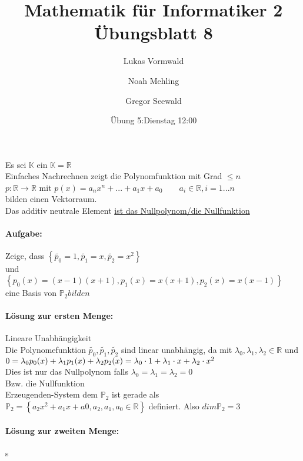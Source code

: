 \documentclass[11pt,a4paper]{article}
\title{Mathematik für Informatiker 2\\Übungsblatt 8}
\author{Lukas Vormwald \and Noah Mehling \and Gregor Seewald}
\date{Übung 5:Dienstag 12:00}
\newcommand{\meth}[1]{\ensuremath{\mathbb{#1}}}
\begin{document}
  Es sei $\mathbb{K}$ ein $\mathbb{K}=\mathbb{R}$\\
  Einfaches Nachrechnen zeigt die Polynomfunktion mit Grad $\leq n$\\
  $p:\mathbb{R}\to\mathbb{R}$ mit $p(x)=a_nx^n+...+a_1x+a_0\qquad a_i\in\mathbb{R},i=1...n$\\
  bilden einen Vektorraum.\\
  Das additiv neutrale Element \underline{ist das Nullpolynom/die Nullfunktion}\\
  \paragraph{Aufgabe:}
    Zeige, dass $\left\lbrace \tilde{p_0}=1,\tilde{p_1}=x,\tilde{p_2}=x^2\right\rbrace$\\
    und\\
    $\left\lbrace p_0(x)=(x-1)(x+1),p_1(x)=x(x+1),p_2(x)=x(x-1)\right\rbrace$\\
    eine Basis von $\mathbb{P}_2 bilden$\\
  \paragraph{Lösung zur ersten Menge:}
    Lineare Unabhängigkeit\\
    Die Polynomefunktion $\tilde{p_0},\tilde{p_1},\tilde{p_2}$ sind linear unabhängig, da mit $\lambda_0,\lambda_1,\lambda_2\in\mathbb{R}$ und\\
    $0=\lambda_0 p_0(x)+\lambda_1 p_1(x)+\lambda_2 p_2(x)\\
    =\lambda_0 \cdot 1 +\lambda_1 \cdot x +\lambda_2 \cdot x^2$\\
    Dies ist nur das Nullpolynom falls $\lambda_0=\lambda_1=\lambda_2=0$\\
    Bzw. die Nullfunktion\\
    Erzeugenden-System dem $\meth{P}_2$ ist gerade als $\meth{P}_2=\left\lbrace a_2x^2+a_1x+a0, a_2,a_1,a_0\in\meth{R}\right\rbrace$ definiert. Also $dim\meth{P}_2=3$\\
  \paragraph{Lösung zur zweiten Menge:}
    s
\end{document}
